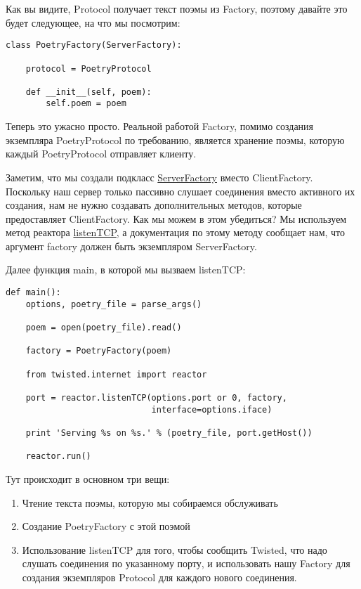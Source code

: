 Как вы видите, Protocol получает текст поэмы из Factory, 
поэтому давайте это будет следующее, на что мы посмотрим:

 \begin{verbatim}
class PoetryFactory(ServerFactory):

    protocol = PoetryProtocol

    def __init__(self, poem):
        self.poem = poem
\end{verbatim} 


Теперь это ужасно просто. Реальной работой Factory, помимо создания 
экземпляра PoetryProtocol по требованию, является хранение поэмы, 
которую каждый PoetryProtocol отправляет клиенту.  


Заметим, что мы создали подкласс  
\href{http://twistedmatrix.com/trac/browser/tags/releases/twisted-8.2.0/twisted/internet/protocol.py#L317}{ServerFactory} 
вместо ClientFactory. Поскольку наш сервер только пассивно 
слушает соединения вместо активного их создания, нам не нужно 
создавать дополнительных методов, которые предоставляет ClientFactory. 
Как мы можем в этом убедиться? Мы используем метод реактора  
\href{http://twistedmatrix.com/trac/browser/tags/releases/twisted-8.2.0/twisted/internet/interfaces.py#L224}{listenTCP}, 
а документация по этому методу сообщает нам, что аргумент factory 
должен быть экземпляром ServerFactory.


Далее функция main, в которой мы вызваем listenTCP: 

 \begin{verbatim}
def main():
    options, poetry_file = parse_args()

    poem = open(poetry_file).read()

    factory = PoetryFactory(poem)

    from twisted.internet import reactor

    port = reactor.listenTCP(options.port or 0, factory,
                             interface=options.iface)

    print 'Serving %s on %s.' % (poetry_file, port.getHost())

    reactor.run()
\end{verbatim} 


Тут происходит в основном три вещи:
\begin{enumerate}
\item Чтение текста поэмы, которую мы собираемся обслуживать
\item Создание PoetryFactory с этой поэмой
\item Использование listenTCP для того, чтобы сообщить Twisted, 
что надо слушать соединения по указанному порту, и использовать 
нашу Factory для создания экземпляров Protocol для каждого 
нового соединения.
\end{enumerate}

